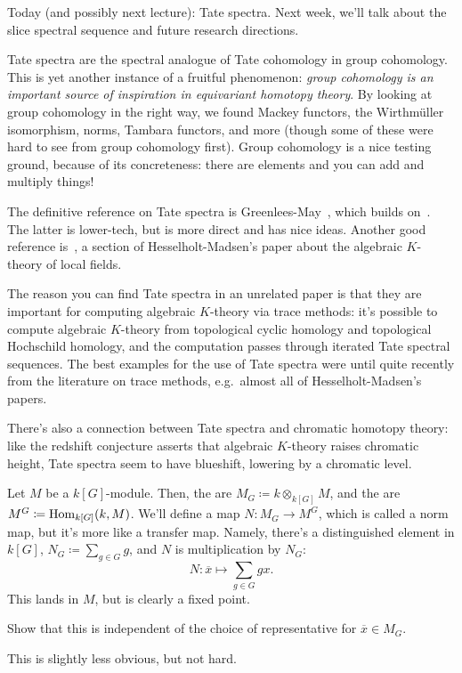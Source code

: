 Today (and possibly next lecture): Tate spectra. Next week, we'll talk about the slice spectral sequence and future
research directions.

Tate spectra are the spectral analogue of Tate cohomology in group cohomology. This is yet another instance of a
fruitful phenomenon: \emph{group cohomology is an important source of inspiration in equivariant homotopy theory}.
By looking at group cohomology in the right way, we found Mackey functors, the Wirthmüller isomorphism, norms,
Tambara functors, and more (though some of these were hard to see from group cohomology first). Group cohomology is
a nice testing ground, because of its concreteness: there are elements and you can add and multiply things!
\begin{rem}
The definitive reference on Tate spectra is Greenlees-May~\cite{GeneralizedTate}, which builds on~\cite{ACD}. The
latter is lower-tech, but is more direct and has nice ideas. Another good reference is~\cite[\S 4]{HM03}, a section
of Hesselholt-Madsen's paper about the algebraic $K$-theory of local fields.

The reason you can find Tate spectra in an  unrelated paper is that they are important for
computing algebraic $K$-theory via trace methods: it's possible to compute algebraic $K$-theory from topological
cyclic homology and topological Hochschild homology, and the computation passes through iterated Tate spectral
sequences. The best examples for the use of Tate spectra were until quite recently from the literature on trace
methods, e.g.\ almost all of Hesselholt-Madsen's papers.

There's also a connection between Tate spectra and chromatic homotopy theory: like the redshift conjecture asserts
that algebraic $K$-theory raises chromatic height, Tate spectra seem to have blueshift, lowering by a chromatic
level.
\end{rem}
Let $M$ be a $k[G]$-module. Then, the  are $M_G\coloneqq k\otimes_{k[G]} M$, and the
 are $M^G\coloneqq\operatorname{Hom}_{k[G]}(k, M)$. We'll define a map $N\colon M_G\to M^G$, which
is called a norm map, but it's more like a transfer map. Namely, there's a distinguished element in $k[G]$,
$N_G\coloneqq \sum_{g\in G} g$, and $N$ is multiplication by $N_G$:
\[N\colon \overline x\mapsto\sum_{g\in G} gx.\]
This lands in $M$, but is clearly a fixed point.
\begin{ex}
Show that this is independent of the choice of representative for $\overline x\in M_G$.
\end{ex}
This is slightly less obvious, but not hard.

